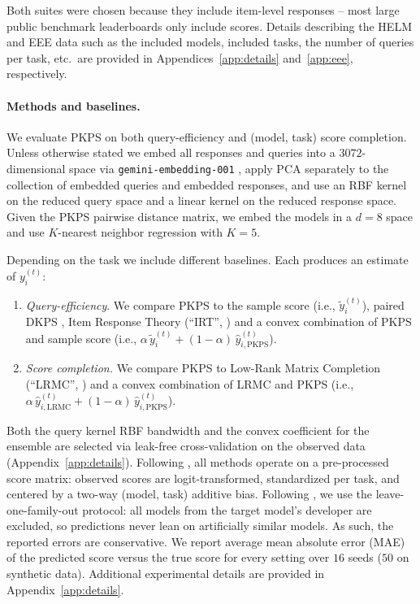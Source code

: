 \documentclass{article}
\theoremstyle{definition}
\theoremstyle{remark}
\theoremstyle{plain}
\newcommand{\PKPS}{PKPS\xspace}
\begin{document}
Both suites were chosen because they include item-level responses -- most large
public benchmark leaderboards only include scores.
Details describing the HELM and EEE data such as the included models, included
tasks, the number of queries per task, etc.\ are provided in
Appendices~\ref{app:details} and~\ref{app:eee}, respectively.

\paragraph{Methods and baselines.} We evaluate \PKPS on both query-efficiency and
(model, task) score completion.
Unless otherwise stated we embed all responses and queries into a $3072$-dimensional
space via \texttt{gemini-embedding-001} \citep{lee2025gemini}, apply PCA separately to the collection of embedded queries and embedded responses, and use an RBF kernel on the
reduced query space and a linear kernel on the reduced response space.
Given the \PKPS pairwise distance matrix, we embed the models in a $d = 8$ space and
use $K$-nearest neighbor regression with $K = 5$.

Depending on the task we include different baselines. Each produces an estimate of
$y_{i}^{(t)}$:
\begin{enumerate}[wide, labelwidth=1pt, labelindent=12pt]
    \item \emph{Query-efficiency}. We compare \PKPS to the sample score (i.e.,
    $\tilde{y}_{i}^{(t)}$), paired DKPS \citep{dkps_qeff}, Item Response Theory
    (``IRT'', \citealp{polo2024tinybenchmarks}) and a convex combination
    of \PKPS and sample score (i.e.,
    $\alpha\,\tilde{y}_{i}^{(t)}+(1-\alpha)\,\hat{y}^{(t)}_{i,\mathrm{PKPS}}$).
    \item \emph{Score completion.} We compare \PKPS to Low-Rank Matrix Completion
    (``LRMC'', \citealp{benchpress}) and a convex combination of LRMC and \PKPS
    (i.e., $\alpha\,\hat{y}^{(t)}_{i,\mathrm{LRMC}}+(1-\alpha)\,\hat{y}^{(t)}_{i,\mathrm{PKPS}}$).
\end{enumerate}
Both the query kernel RBF bandwidth and the convex coefficient for the ensemble are
selected via leak-free cross-validation on the observed data (Appendix~\ref{app:details}).
Following \citet{benchpress}, all methods operate on a pre-processed score matrix:
observed scores are logit-transformed, standardized per task, and centered by a
two-way (model, task) additive bias.
Following \citet{dkps_qeff}, we use the leave-one-family-out protocol: all models from the
target model's developer are excluded, so predictions never lean on artificially similar models. As such, the reported errors are conservative.
We report average mean absolute error (MAE) of the predicted score versus the true
score for every setting over $16$ seeds ($50$ on synthetic data).
Additional experimental details are provided in Appendix~\ref{app:details}.
\end{document}
